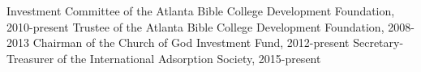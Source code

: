 
Investment Committee of the Atlanta Bible College Development Foundation, 2010-present
Trustee of the Atlanta Bible College Development Foundation, 2008-2013
Chairman of the Church of God Investment Fund, 2012-present
Secretary-Treasurer of the International Adsorption Society, 2015-present

